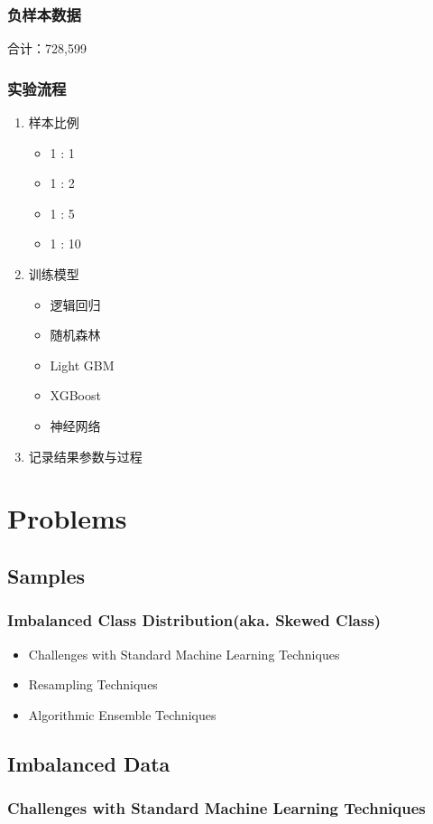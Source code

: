 \documentclass[UTF8,aspectratio=1610,10pt]{ctexbeamer}
\begin{document}
\begin{frame}
\frametitle{负样本数据}
合计：728,599
\end{frame}

\begin{frame}
\frametitle{实验流程}
\begin{enumerate}
  \item 样本比例
	\begin{itemize}
	  \item 1 : 1
	  \item 1 : 2
	  \item 1 : 5
	  \item 1 : 10
	\end{itemize}
  \item 训练模型
	  \begin{itemize}
		  \item 逻辑回归
		  \item 随机森林
		  \item Light GBM
		  \item XGBoost
		  \item 神经网络
		\end{itemize}
  \item 记录结果参数与过程
\end{enumerate}

\end{frame}

\section{Problems}
\subsection{Samples}

\begin{frame}
\frametitle{Imbalanced Class Distribution(aka. Skewed Class)}
\begin{itemize}
  \item Challenges with Standard Machine Learning Techniques
  

  \item Resampling Techniques
  \item Algorithmic Ensemble Techniques
  
\end{itemize}
\end{frame}

\subsection{Imbalanced Data}
\begin{frame}
\frametitle{Challenges with Standard Machine Learning Techniques}

\end{frame}
\end{document}
